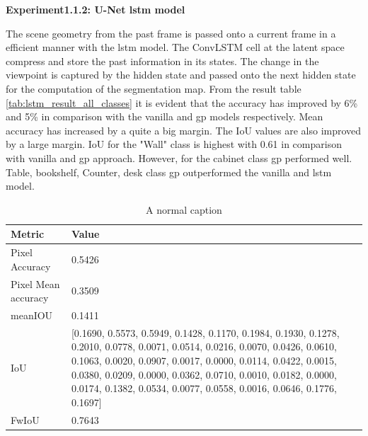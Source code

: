     \newpage
	{ \bf Experiment1.1.2: U-Net lstm model}
	
	The scene geometry from the past frame is passed onto a current frame in a efficient manner with the lstm model. The ConvLSTM cell at the latent space compress and store the past information in its states. The change in the viewpoint is captured by the hidden state and passed onto the next hidden state for the computation of the segmentation map. From the result table \ref{tab:lstm_result_all_classes} it is evident that the accuracy has improved by 6\% and 5\% in comparison with the vanilla and gp models respectively. Mean accuracy has increased by a quite a big margin. The IoU values are also improved by a large margin. IoU for the "Wall" class is highest with 0.61 in comparison with vanilla and gp approach. However, for the cabinet class gp performed well. Table, bookshelf, Counter, desk class gp outperformed the vanilla and lstm model. 
	
	\begin{table}
	\begin{center}
		\begin{tabular}{ | l | p{12cm} |}
			\hline		
			\cellcolor{purple!30}Metric & \cellcolor{purple!30}Value \\ \hline
			Pixel Accuracy & 0.5426 \\ \hline
			Pixel Mean accuracy & 0.3509  \\ \hline
			meanIOU & 0.1411 \\ \hline
			IoU & [0.1690, 0.5573, 0.5949, 0.1428, 0.1170, 0.1984, 0.1930, 0.1278, 0.2010,
			0.0778, 0.0071, 0.0514, 0.0216, 0.0070, 0.0426, 0.0610, 0.1063, 0.0020,
			0.0907, 0.0017, 0.0000, 0.0114, 0.0422, 0.0015, 0.0380, 0.0209, 0.0000,
			0.0362, 0.0710, 0.0010, 0.0182, 0.0000, 0.0174, 0.1382, 0.0534, 0.0077,
			0.0558, 0.0016, 0.0646, 0.1776, 0.1697] \\ \hline
			FwIoU & 0.7643 \\ \hline
			\hline
		\end{tabular}
		\caption{A normal caption}
		\label{tab:caption}
	\end{center}
	\end{table}
	
